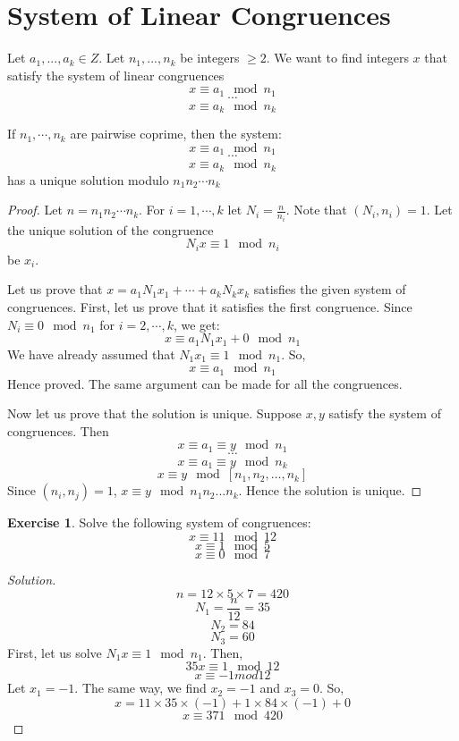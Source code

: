 \documentclass[12pt,letterpaper]{book}
\theoremstyle{definition}
\newtheorem*{exercise}{Exercise}
\newenvironment{solution}
  {\renewcommand\qedsymbol{$\blacksquare$}\begin{proof}[Solution]}
  {\end{proof}}
\begin{document}
\section{System of Linear Congruences}

Let $a_1,...,a_k \in Z$. Let $n_1,...,n_k$ be integers $\geq 2$. We want to find integers $x$ that satisfy the system of linear congruences
\[x \equiv a_1 \mod n_1\]
\[ \cdots \]
\[x \equiv a_k \mod n_k\]

\begin{theorem}
  If $n_1,\cdots, n_k$ are pairwise coprime, then the system:
  \[x \equiv a_1 \mod n_1\]
  \[ \cdots \]
  \[x \equiv a_k \mod n_k\]
  has a unique solution modulo $n_1n_2 \cdots n_k$
\end{theorem}
\begin{proof}
  Let $n = n_1n_2\cdots n_k$. For $i = 1,\cdots,k$ let $N_i = \frac{n}{n_i}$. Note that $(N_i,n_i) = 1$. Let the unique solution of the congruence
  \[N_i x \equiv 1 \mod n_i\]
  be $x_i$.

  Let us prove that $x = a_1N_1x_1 + \cdots + a_kN_k x_k$ satisfies the given system of congruences. First, let us prove that it satisfies the first congruence. Since $N_i \equiv 0 \mod n_1$ for $i = 2, \cdots, k$, we get:
  \[x \equiv a_1 N_1 x_1 + 0 \mod n_1\]
  We have already assumed that $N_1x_1 \equiv 1 \mod n_1$. So,
  \[x \equiv a_1 \mod n_1\]
  Hence proved. The same argument can be made for all the congruences.

  Now let us prove that the solution is unique. Suppose $x,y$ satisfy the system of congruences. Then
  \[x \equiv a_1 \equiv y \mod n_1\]
  \[\cdots\]
  \[x \equiv a_1 \equiv y \mod n_k\]
  \[x \equiv y \mod [n_1,n_2,...,n_k]\]
  Since $(n_i,n_j) = 1$, $x \equiv y \mod n_1n_2...n_k$. Hence the solution is unique.
\end{proof}

\begin{exercise}
  Solve the following system of congruences:
  \[x \equiv 11 \mod 12\]
  \[x \equiv 1 \mod 5\]
  \[x \equiv 0 \mod 7\]
\end{exercise}
\begin{solution}
  \[n = 12 \times 5 \times 7 = 420 \]
  \[N_1 = \frac{n}{12} = 35\]
  \[N_2 = 84\]
  \[N_3 = 60\]
  First, let us solve $N_1 x \equiv 1 \mod n_1$. Then,
  \[35x \equiv 1 \mod 12\]
  \[x \equiv -1 mod 12\]
  Let $x_1 = -1$. The same way, we find $x_2 = -1$ and $x_3 = 0$. So,
  \[x = 11 \times 35 \times (-1) + 1 \times 84 \times (-1) + 0\]
  \[x \equiv 371 \mod 420\]
\end{solution}
\end{document}
